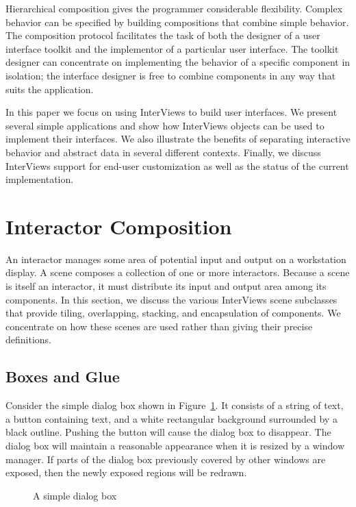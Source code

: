 Hierarchical composition gives the programmer considerable flexibility.
Complex behavior can be specified by building compositions that
combine simple behavior.
The composition protocol facilitates the task of both the designer
of a user interface toolkit and the implementor of
a particular user interface.
The toolkit designer can concentrate on implementing the
behavior of a specific component in isolation;
the interface designer is free to combine components in any way
that suits the application.

In this paper we focus on using InterViews to build user interfaces.
We present several simple applications and show how
InterViews objects can be used to implement their interfaces.  We also
illustrate the benefits of separating interactive behavior and
abstract data in several
different contexts. Finally, we discuss InterViews support for
end-user customization as well as
the status of the current implementation.

\section{Interactor Composition}
An interactor manages some area of potential input and output on a
workstation display.
A scene composes a collection of one or more interactors.
Because a scene is itself an interactor,
it must distribute
its input and output area among its components.
In this section,
we discuss the various InterViews scene subclasses
that provide tiling, overlapping, stacking, and encapsulation
of components.  We concentrate on how
these scenes are used rather than giving their precise definitions.

    \subsection{Boxes and Glue\label{sect:alert}}

Consider the simple dialog box shown in Figure~\ref{alert:alert1}.  It
consists of a string of text, a button containing text, and a white
rectangular background surrounded by a black outline.  Pushing the
button will cause the dialog box to disappear.  The dialog box will
maintain a reasonable appearance when it is resized by a window manager.
If parts of the dialog box previously covered by other windows are
exposed, then the newly exposed regions will be redrawn.

\begin{figure}
\vspace{1.25in}
\caption{A simple dialog box}
\label{alert:alert1}
\end{figure}

